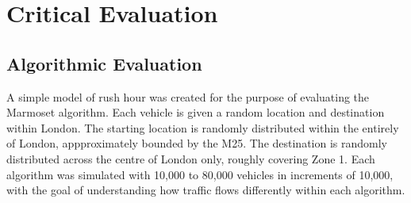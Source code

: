 \documentclass[ %
                    author={Alexander Hill},
                supervisor={Dr. Benjamin Sach},
                    degree={MEng},
                     title={MARMOSET},
                  subtitle={Multi-Agent Route Management using Online Simulation for Efficient Transportation},
                      type={research},
                      year={2016} ]{dissertation}
\begin{document}




\chapter{Critical Evaluation}
\label{chap:evaluation}

\section{Algorithmic Evaluation}

A simple model of rush hour was created for the purpose of evaluating the
Marmoset algorithm. Each vehicle is given a random location and destination
within London. The starting location is randomly distributed within the entirely
of London, appproximately bounded by the M25. The destination is randomly
distributed across the centre of London only, roughly covering Zone 1. Each
algorithm was simulated with 10,000 to 80,000 vehicles in increments of 10,000,
with the goal of understanding how traffic flows differently within each
algorithm.
\end{document}
